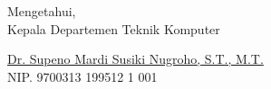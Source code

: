   \vspace{2ex}

  \begin{center}
    Mengetahui, \\
    Kepala Departemen Teknik Komputer \\

    \vspace{8ex}

    \underline{Dr.  Supeno Mardi Susiki Nugroho, S.T., M.T.} \\
    NIP. 9700313 199512 1 001
  \end{center}
\endgroup
